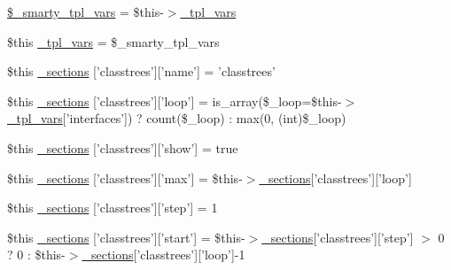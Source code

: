 \begin{DoxyCompactItemize}
\item 
\hyperlink{_06_06202_05_06_062027336986_05classtrees_8tpl_8php_a14dde6d029d65a879ee7bc1ebc398dd1}{\$\-\_\-smarty\-\_\-tpl\-\_\-vars} = \$this-\/$>$\hyperlink{_06_06127_05_06_0612781687_05pkgelementindex_8tpl_8php_a4a4846d8e68d455590131a05697f67a3}{\-\_\-tpl\-\_\-vars}
\item 
\$this \hyperlink{_06_06202_05_06_062027336986_05classtrees_8tpl_8php_a4a4846d8e68d455590131a05697f67a3}{\-\_\-tpl\-\_\-vars} = \$\-\_\-smarty\-\_\-tpl\-\_\-vars
\item 
\$this \hyperlink{_06_06202_05_06_062027336986_05classtrees_8tpl_8php_a7d951df4fee37318b5db551bdaacfc47}{\-\_\-sections} \mbox{[}'classtrees'\mbox{]}\mbox{[}'name'\mbox{]} = 'classtrees'
\item 
\$this \hyperlink{_06_06202_05_06_062027336986_05classtrees_8tpl_8php_a39056ca32644dc1009e6680be58154c4}{\-\_\-sections} \mbox{[}'classtrees'\mbox{]}\mbox{[}'loop'\mbox{]} = is\-\_\-array(\$\-\_\-loop=\$this-\/$>$\hyperlink{_06_06127_05_06_0612781687_05pkgelementindex_8tpl_8php_a4a4846d8e68d455590131a05697f67a3}{\-\_\-tpl\-\_\-vars}\mbox{[}'interfaces'\mbox{]}) ? count(\$\-\_\-loop) \-: max(0, (int)\$\-\_\-loop)
\item 
\$this \hyperlink{_06_06202_05_06_062027336986_05classtrees_8tpl_8php_a9ed73dd0b9365af2ae5c06eaf751f4bb}{\-\_\-sections} \mbox{[}'classtrees'\mbox{]}\mbox{[}'show'\mbox{]} = true
\item 
\$this \hyperlink{_06_06202_05_06_062027336986_05classtrees_8tpl_8php_a6ea7e35a31bfb2f87855dfcd439bcb51}{\-\_\-sections} \mbox{[}'classtrees'\mbox{]}\mbox{[}'max'\mbox{]} = \$this-\/$>$\hyperlink{_06_06127_05_06_0612781687_05pkgelementindex_8tpl_8php_a9e3d26b39edfe29c3f29b8035ef33828}{\-\_\-sections}\mbox{[}'classtrees'\mbox{]}\mbox{[}'loop'\mbox{]}
\item 
\$this \hyperlink{_06_06202_05_06_062027336986_05classtrees_8tpl_8php_a9d63421a2a9bbc8f7695168ccb41f860}{\-\_\-sections} \mbox{[}'classtrees'\mbox{]}\mbox{[}'step'\mbox{]} = 1
\item 
\$this \hyperlink{_06_06202_05_06_062027336986_05classtrees_8tpl_8php_a6baf69090277e46533cd189837f8d3ee}{\-\_\-sections} \mbox{[}'classtrees'\mbox{]}\mbox{[}'start'\mbox{]} = \$this-\/$>$\hyperlink{_06_06127_05_06_0612781687_05pkgelementindex_8tpl_8php_a9e3d26b39edfe29c3f29b8035ef33828}{\-\_\-sections}\mbox{[}'classtrees'\mbox{]}\mbox{[}'step'\mbox{]} $>$ 0 ? 0 \-: \$this-\/$>$\hyperlink{_06_06127_05_06_0612781687_05pkgelementindex_8tpl_8php_a9e3d26b39edfe29c3f29b8035ef33828}{\-\_\-sections}\mbox{[}'classtrees'\mbox{]}\mbox{[}'loop'\mbox{]}-\/1

\end{DoxyCompactItemize}
